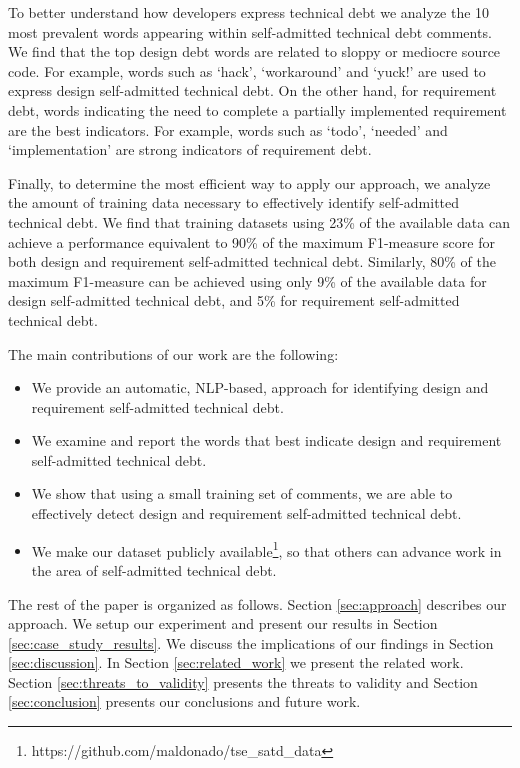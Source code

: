 \documentclass[10pt,journal,compsoc]{IEEEtran}
\newcommand{\SATD}{self-admitted technical debt\xspace}
\begin{document}
To better understand how developers express technical debt we analyze the 10 most prevalent words appearing within \SATD comments. 
We find that the top design debt words are related to sloppy or mediocre source code. For example, words such as `hack', `workaround' and `yuck!' are used to express design \SATD. On the other hand, for requirement debt, words indicating the need to complete a partially implemented requirement are the best indicators. For example, words such as `todo', `needed' and `implementation' are strong indicators of requirement debt. 

Finally, to determine the most efficient way to apply our approach, we analyze the amount of training data necessary to effectively identify \SATD. We find that training datasets using 23\% of the available data can achieve a performance equivalent to 90\% of the maximum F1-measure score for both design and requirement \SATD. Similarly, 80\% of the maximum F1-measure can be achieved using only 9\% of the available data for design \SATD, and 5\% for requirement \SATD.

The main contributions of our work are the following:
\vspace{-1.5mm}
\begin{itemize}
  \item We provide an automatic, NLP-based, approach for identifying design and requirement \SATD.
  \item We examine and report the words that best indicate design and requirement \SATD.
  \item We show that using a small training set of comments, we are able to effectively detect design and requirement \SATD.
  \item We make our dataset publicly available\footnote{https://github.com/maldonado/tse\_satd\_data}, so that others can advance work in the area of \SATD.
\end{itemize}

The rest of the paper is organized as follows. Section \ref{sec:approach} describes our approach. We setup our experiment and present our
results in Section \ref{sec:case_study_results}. We discuss the implications of our findings in Section \ref{sec:discussion}. In Section \ref{sec:related_work} we present the related work. Section \ref{sec:threats_to_validity} presents the threats to validity and Section \ref{sec:conclusion} presents our conclusions and future work.  
\end{document}
